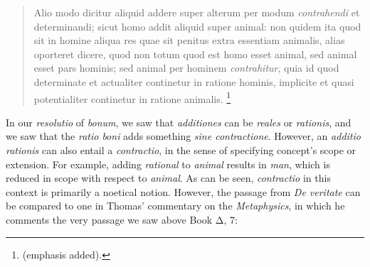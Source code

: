 \begin{quotation}
Alio modo dicitur aliquid addere super alterum per modum \emph{contrahendi} et determinandi; sicut homo addit aliquid super animal: non quidem ita quod sit in homine aliqua res quae sit penitus extra essentiam animalis, alias oporteret dicere, quod non totum quod est homo esset animal, sed animal esset pars hominis; sed animal per hominem \emph{contrahitur}, quia id quod determinate et actualiter continetur in ratione hominis, implicite et quasi potentialiter continetur in ratione animalis.%
%
\footnote{\cite[q.~21, a.~1, co.]{st:deveritate} (emphasis added).}
\end{quotation}
%
In our \emph{resolutio} of \emph{bonum}, we saw that \emph{additiones} can be \emph{reales} or \emph{rationis}, and we saw that the \emph{ratio boni} adds something \emph{sine contractione}. However, an \emph{additio rationis} can also entail a \emph{contractio}, in the sense of specifying concept’s scope or extension. For example, adding \emph{rational} to \emph{animal} results in \emph{man}, which is reduced in scope with respect to \emph{animal}. As can be seen, \emph{contractio} in this context is primarily a noetical notion. However, the passage from \emph{De veritate} can be compared to one in Thomas’ commentary on the \emph{Metaphysics}, in which he comments the very passage we saw above Book Δ, 7:

